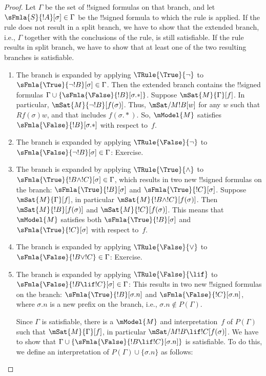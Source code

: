 \documentclass[../../../include/open-logic-section]{subfiles}
\begin{document}
\begin{proof}
Let $\Gamma$ be the set of !!{signed formula}s on that branch, and let
$\sFmla{S}{!A}[\sigma] \in \Gamma$ be the !!{signed formula} to which
the rule is applied. If the rule does not result in a split branch, we
have to show that the extended branch, i.e., $\Gamma$ together with
the conclusions of the rule, is still satisfiable. If the rule results
in split branch, we have to show that at least one of the two
resulting branches is satisfiable.
\begin{enumerate}
\item The branch is expanded by applying $\TRule{\True}{\lnot}$ to
  $\sFmla{\True}{\lnot !B}[\sigma] \in \Gamma$. Then the extended
  branch contains the !!{signed formula}s $\Gamma \cup
  \{\sFmla{\False}{!B}[\sigma.{*}]\}$. Suppose $\mSat{M}{\Gamma}[f]$.
  In particular, $\mSat{M}{\lnot !B}[f(\sigma)]$. Thus,
  $\mSat/{M}{!B}[w]$ for any $w$ such that $Rf(\sigma)w$, and that
  includes $f(\sigma.{*})$. So, $\mModel{M}$ satisfies
  $\sFmla{\False}{!B}[\sigma.{*}]$ with respect to~$f$.
\item The branch is expanded by applying $\TRule{\False}{\lnot}$ to
  $\sFmla{\False}{\lnot !B}[\sigma] \in \Gamma$: Exercise.
\item The branch is expanded by applying $\TRule{\True}{\land}$ to
  $\sFmla{\True}{!B \land !C}[\sigma] \in \Gamma$, which results in
  two new !!{signed formula}s on the branch:
  $\sFmla{\True}{!B}[\sigma]$ and $\sFmla{\True}{!C}[\sigma]$. Suppose
  $\mSat{M}{\Gamma}[f]$, in particular $\mSat{M}{!B \land
    !C}[f(\sigma)]$. Then $\mSat{M}{!B}[f(\sigma)]$ and
  $\mSat{M}{!C}[f(\sigma)]$. This means that $\mModel{M}$ satisfies
  both $\sFmla{\True}{!B}[\sigma]$ and $\sFmla{\True}{!C}[\sigma]$
  with respect to~$f$.
\item The branch is expanded by applying $\TRule{\False}{\lor}$ to
  $\sFmla{\False}{!B \lor !C} \in \Gamma$: Exercise.
\item The branch is expanded by applying $\TRule{\False}{\lif}$ to
  $\sFmla{\False}{!B \lif !C}[\sigma] \in \Gamma$: This results in two
  new !!{signed formula}s on the branch: $\sFmla{\True}{!B}[\sigma.n]$ and
  $\sFmla{\False}{!C}[\sigma.n]$, where $\sigma.n$ is a
  new prefix on the branch, i.e., $\sigma.n \notin P(\Gamma)$. 
  
  Since $\Gamma$ is satisfiable, there is a $\mModel{M}$ and
  interpretation~$f$ of $P(\Gamma)$ such that $\mSat{M}{\Gamma}[f]$, in
  particular $\mSat/{M}{!B \lif !C}[f(\sigma)]$. We have to show that
  $\Gamma \cup \{\sFmla{\False}{!B \lif !C}[\sigma.n]\}$ is
  satisfiable. To do this, we define an interpretation of $P(\Gamma)
  \cup \{\sigma.n\}$ as follows:
  

\end{enumerate}
\end{proof}
\end{document}
